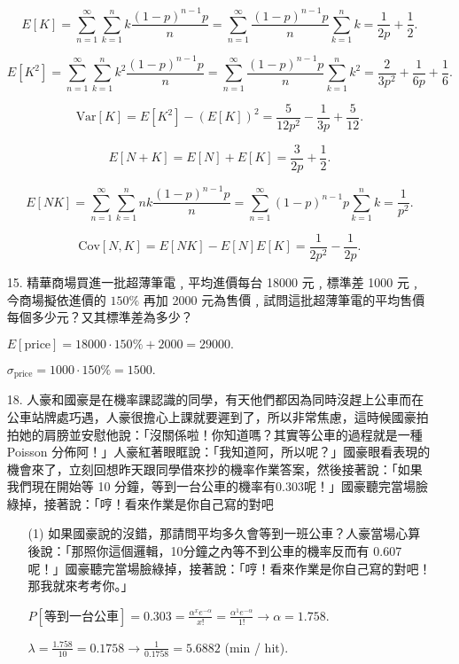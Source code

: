 \documentclass{article}
\begin{document}
\begin{enumerate}
    $$E[K] = \sum_{n = 1}^\infty\sum_{k = 1}^n k \frac{(1 - p)^{n - 1}p}{n} = \sum_{n = 1}^\infty \frac{(1 - p)^{n - 1}p}{n} \sum_{k = 1}^n k = \frac{1}{2p} + \frac{1}{2}.$$

    $$E[K^2] = \sum_{n = 1}^\infty\sum_{k = 1}^n k^2 \frac{(1 - p)^{n - 1}p}{n} = \sum_{n = 1}^\infty \frac{(1 - p)^{n - 1}p}{n} \sum_{k = 1}^n k^2 = \frac{2}{3p^2} + \frac{1}{6p} + \frac{1}{6}.$$

    $$\text{Var}[K] = E[K^2] - (E[K])^2 = \frac{5}{12p^2} - \frac{1}{3p} + \frac{5}{12}.$$

    $$E[N + K] = E[N] + E[K] = \frac{3}{2p} + \frac{1}{2}.$$

    $$E[NK] = \sum_{n = 1}^\infty\sum_{k = 1}^n nk \frac{(1 - p)^{n - 1}p}{n} = \sum_{n = 1}^\infty (1 - p)^{n - 1} p \sum_{k = 1}^n k = \frac{1}{p^2}.$$

    $$\text{Cov}[N, K] = E[NK] - E[N]E[K] = \frac{1}{2p^2} - \frac{1}{2p}.$$

    \item [15.] 精華商場買進一批超薄筆電﹐平均進價每台 18000 元﹐標準差 1000 元﹐今商場擬依進價的 $150\%$ 再加 2000 元為售價﹐試問這批超薄筆電的平均售價每個多少元？又其標準差為多少？
    
    $E[\text{price}] = 18000 \cdot 150\% + 2000 = 29000.$
                
    $\sigma_{\text{price}} = 1000 \cdot 150\% = 1500.$

    \item [18.] 人豪和國豪是在機率課認識的同學，有天他們都因為同時沒趕上公車而在公車站牌處巧遇，人豪很擔心上課就要遲到了，所以非常焦慮，這時候國豪拍拍她的肩膀並安慰他說：「沒關係啦！你知道嗎？其實等公車的過程就是一種 Poisson 分佈阿！」人豪紅著眼眶說：「我知道阿，所以呢？」國豪眼看表現的機會來了，立刻回想昨天跟同學借來抄的機率作業答案，然後接著說：「如果我們現在開始等 10 分鐘，等到一台公車的機率有0.303呢！」國豪聽完當場臉綠掉，接著說：「哼！看來作業是你自己寫的對吧
    
    \begin{enumerate}
        \item [(1)] 如果國豪說的沒錯，那請問平均多久會等到一班公車？人豪當場心算後說：「那照你這個邏輯，10分鐘之內等不到公車的機率反而有 0.607 呢！」國豪聽完當場臉綠掉，接著說：「哼！看來作業是你自己寫的對吧！那我就來考考你。」

        $P[\text{等到一台公車}] = 0.303 = \frac{\alpha^x e^{-\alpha}}{x!} = \frac{\alpha^1 e^{-\alpha}}{1!} \to \alpha = 1.758$.

        $\lambda = \frac{1.758}{10} = 0.1758 \to \frac{1}{0.1758} = 5.6882$ (min / hit).


\end{enumerate}
\end{enumerate}
\end{document}

